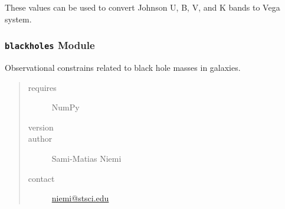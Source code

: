 \documentclass[letterpaper,10pt,english]{sphinxmanual}
\begin{document}

\begin{fulllineitems}
\label{SamPy.astronomy:SamPy.astronomy.basics.JohnsonToABmagnitudes}
These values can be used to convert
Johnson U, B, V, and K bands to Vega system.

\end{fulllineitems}



\subsubsection{\texttt{blackholes} Module}
\label{SamPy.astronomy:module-SamPy.astronomy.blackholes}\label{SamPy.astronomy:blackholes-module}
Observational constrains related to black hole
masses in galaxies.
\begin{quote}\begin{description}
\item[{requires}] \leavevmode
NumPy

\item[{version}] 

\item[{author}] \leavevmode
Sami-Matias Niemi

\item[{contact}] \leavevmode
\href{mailto:niemi@stsci.edu}{niemi@stsci.edu}

\end{description}\end{quote}

\end{document}
